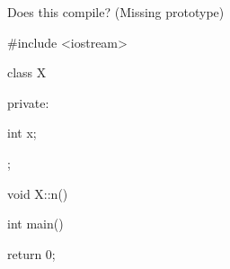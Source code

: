 Does this compile? (Missing prototype)



\begin{consolethree}[escapeinside=||]

#include <iostream>



class X

{

private:

    int x;

};



void X::n()

{

}



int main()

{

    return 0;

}

\end{consolethree}

